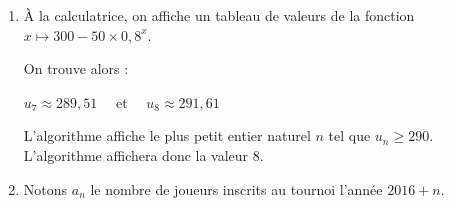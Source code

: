 \begin{corrige}
\begin{enumerate}
          \begin{enumerate}[label=\alph*.]
               \item %
               Pour tout entier naturel $n$, $v_{n}= u_{n}-300$ ; par conséquent :
               \par
               $v_{n+1}= u_{n+1}-300$.
               \par
               Comme $u_{n+1}=0,8u_n + 60$ :
               \par
               $v_{n+1} = 0,8u_n+60-300$\\
               $\phantom{v_{n+1}} = 0,8u_n-240.$
               \par
               Puisque $v_{n}= u_{n}-300$, alors $u_{n}= v_{n}+300$. On en déduit :
               \par
               $v_{n+1} = 0,8(v_n+300)-240$\\
               $\phantom{v_{n+1}} = 0,8v_n+240-240$\\
               $\phantom{v_{n+1}} = 0,8v_n.$
               \par
               Par ailleurs :
               \par
               $v_{0}= u_{0}-300=250-300=-50$.
               \par
               La suite $(v_n)$ est une suite géométrique de premier terme ${v_0=-50}$ et de raison $0,8$.
               \item %
               La suite $(v_n)$ étant une suite géométrique :
               \par
               $v_n=v_0q^n=-50 \times 0,8^n$.
               \item %
               D'après les questions précédentes :
               \par
               $u_{n}= v_{n}+300 = 300 -50 \times 0,8^n$.
          \end{enumerate}
          \item %
          \`A la calculatrice, on affiche un tableau de valeurs de la fonction $x \longmapsto 300 -50 \times 0,8^x$.
          \par
          On trouve alors :
          \par
          $u_7 \approx 289,51 \quad $ et $\quad u_8 \approx 291,61 $
          \par
          L'algorithme affiche le plus petit entier naturel $n$ tel que $u_n \geqslant 290$. L'algorithme affichera donc la valeur 8.
          \item %
          Notons $a_n$ le nombre de joueurs inscrits au tournoi l'année $2016+n$.

\end{enumerate}
\end{corrige}
